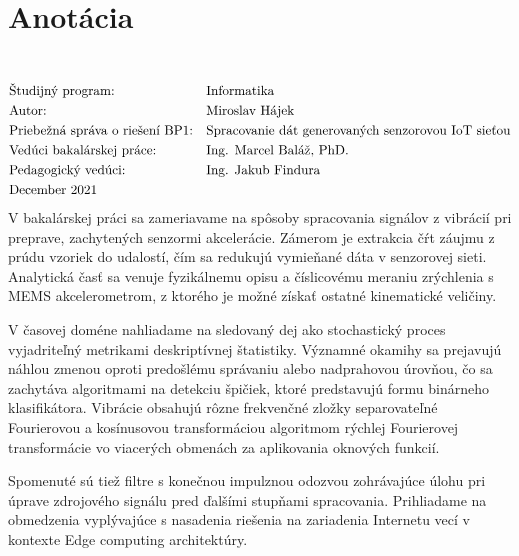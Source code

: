 \thispagestyle{empty}
\section*{Anotácia}
\University \\
\uppercase{\Faculty}
\vspace{-8pt}
{\setlength{\mathindent}{0cm}
\begin{align*}
&\text{Študijný program:} && \text{\StudyProgramme} \\
&\text{Autor:} && \text{\Author} \\
&\text{\Thesis:} && \text{\Title} \\
&\text{Vedúci bakalárskej práce:} && \text{\Supervisor} \\
&\text{Pedagogický vedúci:} && \text{\PedagogicalSupervisor} \\
&\text{\Date}
\end{align*}}
V bakalárskej práci sa zameriavame na spôsoby spracovania signálov z vibrácií pri preprave, zachytených
senzormi akcelerácie. Zámerom je extrakcia čŕt záujmu z prúdu vzoriek do udalostí, čím sa redukujú vymieňané
dáta v senzorovej sieti. Analytická časť sa venuje fyzikálnemu opisu a číslicovému meraniu zrýchlenia s MEMS akcelerometrom,
z ktorého je možné získať ostatné kinematické veličiny. 

V časovej doméne nahliadame na sledovaný dej ako stochastický
proces vyjadriteľný metrikami deskriptívnej štatistiky. Významné okamihy sa prejavujú náhlou zmenou oproti predošlému správaniu
alebo nadprahovou úrovňou, čo sa zachytáva algoritmami na detekciu špičiek, ktoré predstavujú formu binárneho klasifikátora.
Vibrácie obsahujú rôzne frekvenčné zložky separovateľné Fourierovou a kosínusovou transformáciou algoritmom rýchlej Fourierovej
transformácie vo viacerých obmenách za aplikovania oknových funkcií. 

Spomenuté sú tiež filtre s konečnou impulznou odozvou
zohrávajúce úlohu pri úprave zdrojového signálu pred ďalšími stupňami spracovania. Prihliadame na obmedzenia vyplývajúce
s nasadenia riešenia na zariadenia Internetu vecí v kontexte Edge computing architektúry.

\emptypage

\thispagestyle{empty}
